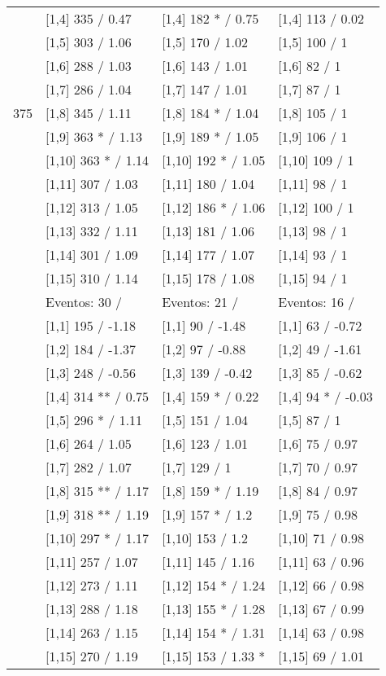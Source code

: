\begin{table}
\begin{tabular}[t]{llll}
\addlinespace
 & {}[1,4] 335  / 0.47 & {}[1,4] 182 * / 0.75 & {}[1,4] 113  / 0.02\\
 & {}[1,5] 303  / 1.06 & {}[1,5] 170  / 1.02 & {}[1,5] 100  / 1\\
 & {}[1,6] 288  / 1.03 & {}[1,6] 143  / 1.01 & {}[1,6] 82  / 1\\
 & {}[1,7] 286  / 1.04 & {}[1,7] 147  / 1.01 & {}[1,7] 87  / 1\\
375 & {}[1,8] 345  / 1.11 & {}[1,8] 184 * / 1.04 & {}[1,8] 105  / 1\\
\addlinespace
 & {}[1,9] 363 * / 1.13 & {}[1,9] 189 * / 1.05 & {}[1,9] 106  / 1\\
 & {}[1,10] 363 * / 1.14 & {}[1,10] 192 * / 1.05 & {}[1,10] 109  / 1\\
 & {}[1,11] 307  / 1.03 & {}[1,11] 180  / 1.04 & {}[1,11] 98  / 1\\
 & {}[1,12] 313  / 1.05 & {}[1,12] 186 * / 1.06 & {}[1,12] 100  / 1\\
 & {}[1,13] 332  / 1.11 & {}[1,13] 181  / 1.06 & {}[1,13] 98  / 1\\
\addlinespace
 & {}[1,14] 301  / 1.09 & {}[1,14] 177  / 1.07 & {}[1,14] 93  / 1\\
 & {}[1,15] 310  / 1.14 & {}[1,15] 178  / 1.08 & {}[1,15] 94  / 1\\
 & Eventos:  30 / & Eventos:  21 / & Eventos:  16 /\\
 & {}[1,1] 195  / -1.18 & {}[1,1] 90  / -1.48 & {}[1,1] 63  / -0.72\\
 & {}[1,2] 184  / -1.37 & {}[1,2] 97  / -0.88 & {}[1,2] 49  / -1.61\\
\addlinespace
 & {}[1,3] 248  / -0.56 & {}[1,3] 139  / -0.42 & {}[1,3] 85  / -0.62\\
 & {}[1,4] 314 ** / 0.75 & {}[1,4] 159 * / 0.22 & {}[1,4] 94 * / -0.03\\
 & {}[1,5] 296 * / 1.11 & {}[1,5] 151  / 1.04 & {}[1,5] 87  / 1\\
 & {}[1,6] 264  / 1.05 & {}[1,6] 123  / 1.01 & {}[1,6] 75  / 0.97\\
 & {}[1,7] 282  / 1.07 & {}[1,7] 129  / 1 & {}[1,7] 70  / 0.97\\
\addlinespace
500 & {}[1,8] 315 ** / 1.17 & {}[1,8] 159 * / 1.19 & {}[1,8] 84  / 0.97\\
 & {}[1,9] 318 ** / 1.19 & {}[1,9] 157 * / 1.2 & {}[1,9] 75  / 0.98\\
 & {}[1,10] 297 * / 1.17 & {}[1,10] 153  / 1.2 & {}[1,10] 71  / 0.98\\
 & {}[1,11] 257  / 1.07 & {}[1,11] 145  / 1.16 & {}[1,11] 63  / 0.96\\
 & {}[1,12] 273  / 1.11 & {}[1,12] 154 * / 1.24 & {}[1,12] 66  / 0.98\\
\addlinespace
 & {}[1,13] 288  / 1.18 & {}[1,13] 155 * / 1.28 & {}[1,13] 67  / 0.99\\
 & {}[1,14] 263  / 1.15 & {}[1,14] 154 * / 1.31 & {}[1,14] 63  / 0.98\\
 & {}[1,15] 270  / 1.19 & {}[1,15] 153  / 1.33 * & {}[1,15] 69  / 1.01\\
\bottomrule
\end{tabular}
\end{table}
